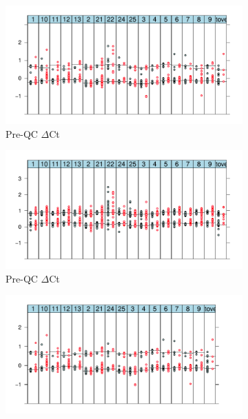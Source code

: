 \hspace{-2cm}
\begin{figure}[!h]
    \begin{subfigure}[b]{.4\textwidth}
    \includegraphics[scale=.5] {KIR/figures/KIR3DS1-preQC.pdf}
    \caption{ \label{Figure-S1:a}
      Pre-QC  $\Delta$Ct}
    \end{subfigure}
    \begin{subfigure}[b]{.4\textwidth}
    \includegraphics[scale=.5] {KIR/figures/KIR3DL1-preQC.pdf}
    \caption{ \label{Figure-S1:b}
      Pre-QC  $\Delta$Ct}
    \end{subfigure}
    \begin{subfigure}[b]{.4\textwidth}
    \includegraphics[scale=.5] {KIR/figures/KIR3DS1-postQC.pdf}

\end{subfigure}
\end{figure}
